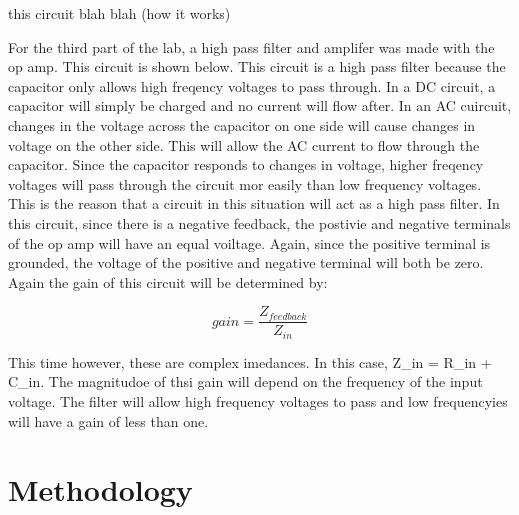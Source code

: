 \documentclass[twocolumn, amsmath]{revtex4}
\begin{document}
this circuit blah blah (how it works)

For the third part of the lab, a high pass filter and amplifer was made with the op amp. This circuit is shown below. This circuit is a high pass filter because the capacitor only allows high freqency voltages to pass through. In a DC circuit, a capacitor will simply be charged and no current will flow after. In an AC cuircuit, changes in the voltage across the capacitor on one side will cause changes in voltage on the other side. This will allow the AC current to flow through the capacitor. Since the capacitor responds to changes in voltage, higher freqency voltages will pass through the circuit mor easily than low frequency voltages. This is the reason that a circuit in this situation will act as a high pass filter. In this circuit, since there is a negative feedback, the postivie and negative terminals of the op amp will have an equal voiltage. Again, since the positive terminal is grounded, the voltage of the positive and negative terminal will both be zero. Again the gain of this circuit will be determined by:

\begin{equation}
gain =  \frac{Z_{feedback}}{Z_{in}}
\end{equation}


This time however, these are complex imedances. In this case, Z_{in} = R_{in} + C_{in}. The magnitudoe of thsi gain will depend on the frequency of the input voltage. The filter will allow high frequency voltages to pass and low frequencyies will have a gain of less than one.




\section{Methodology}
\end{document}
